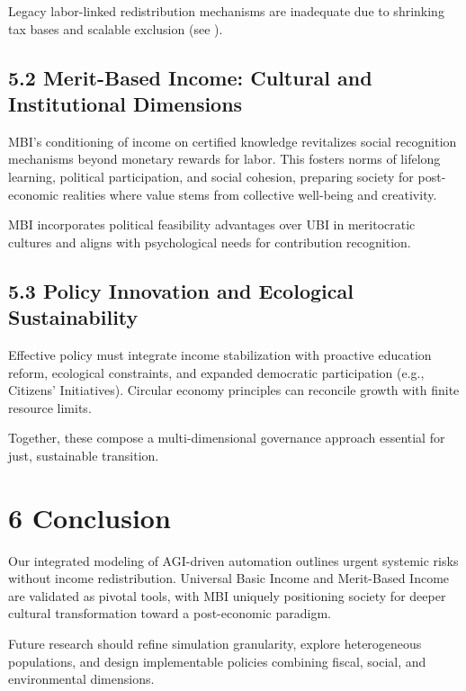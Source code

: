 \documentclass[11pt]{amsart}
\begin{document}
Legacy labor-linked redistribution mechanisms are inadequate due to shrinking tax bases and scalable exclusion (see \cite{MIT2025}).


\hypertarget{x-5.2-merit-based-income:-cultural-and-institutional-dimensions}{\subsection{5.2 Merit-Based Income: Cultural and Institutional Dimensions}}
MBI’s conditioning of income on certified knowledge revitalizes social recognition mechanisms beyond monetary rewards for labor. This fosters norms of lifelong learning, political participation, and social cohesion, preparing society for post-economic realities where value stems from collective well-being and creativity.


MBI incorporates political feasibility advantages over UBI in meritocratic cultures and aligns with psychological needs for contribution recognition.


\hypertarget{x-5.3-policy-innovation-and-ecological-sustainability}{\subsection{5.3 Policy Innovation and Ecological Sustainability}}
Effective policy must integrate income stabilization with proactive education reform, ecological constraints, and expanded democratic participation (e.g., Citizens’ Initiatives). Circular economy principles can reconcile growth with finite resource limits.


Together, these compose a multi-dimensional governance approach essential for just, sustainable transition.


\hypertarget{x-6-conclusion}{\section{6 Conclusion}}
Our integrated modeling of AGI-driven automation outlines urgent systemic risks without income redistribution. Universal Basic Income and Merit-Based Income are validated as pivotal tools, with MBI uniquely positioning society for deeper cultural transformation toward a post-economic paradigm.


Future research should refine simulation granularity, explore heterogeneous populations, and design implementable policies combining fiscal, social, and environmental dimensions.
\end{document}
